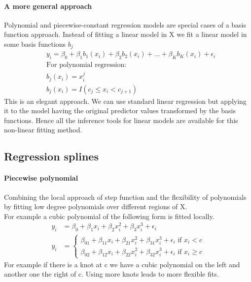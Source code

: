 \documentclass[../document.tex]{subfiles}
\begin{document}
	\paragraph{A more general approach}
	Polynomial and piecewise-constant regression models are special cases of a basis function approach. Instead of fitting a linear model in X we fit a linear model in some basis functions \(b_{j}\)
	\begin{equation}
	\begin{split}
		&y_{i}=\beta_{0}+\beta_{1}b_{1}(x_{i})+\beta_{2}b_{2}(x_{i})+...+\beta_{K}b_{K}(x_{i})+\epsilon_{i}\\
		&\text{For polynomial regression:}\\
		&b_{j}(x_{i})=x_{i}^j\\
		&b_{j}(x_{i})=I(c_{j}\leq x_{i} < c_{j+1})
	\end{split}
	\end{equation}
	This is an elegant approach. We can use standard linear regression but applying it to the model having the original predictor values transformed by the basis functions. Hence all the inference tools for linear models are available for this non-linear fitting method.

	\subsection{Regression splines}

	\paragraph{Piecewise polynomial}
	Combining the local approach of step function and the flexibility of polynomials by fitting low degree polynomials over different regions of X.\\
	For example a cubic polynomial of the following form is fitted locally.
	\begin{equation}
	\begin{split}
		y_{i}&=\beta_{0}+\beta_{1}x_{i}+\beta_{2}x_{i}^2+\beta_{3}x_{i}^3+\epsilon_{i}\\
		y_{i}&=\begin{cases}
			\beta_{01}+\beta_{11}x_{i}+\beta_{21}x_{i}^2+\beta_{31}x_{i}^3+\epsilon_{i} \text{  if  } x_{i} < c\\
			\beta_{02}+\beta_{12}x_{i}+\beta_{22}x_{i}^2+\beta_{32}x_{i}^3+\epsilon_{i} \text{  if  } x_{i} \geq c
		\end{cases}
	\end{split}
	\end{equation}
	For example if there is a knot at c we have a cubic polynomial on the left and another one the right of c. Using more knots leads to more flexible fits.
\end{document}
